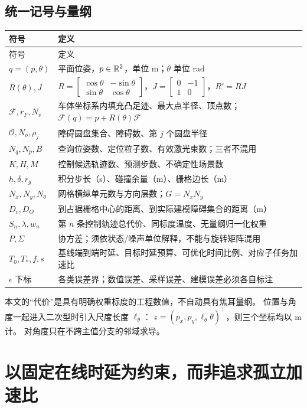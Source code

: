 \subsection{统一记号与量纲}
\begin{longtable}{p{}p{}}
\toprule 符号 & 定义\\\midrule\endfirsthead
\toprule 符号 & 定义\\\midrule\endhead
$q=(p,\theta)$ & 平面位姿，$p\in\mathbb R^2$，单位 m；$\theta$ 单位 rad\\
$R(\theta),J$ & $R=\left[\begin{smallmatrix}\cos\theta&-\sin\theta\\\sin\theta&\cos\theta\end{smallmatrix}\right]$，$J=\left[\begin{smallmatrix}0&-1\\1&0\end{smallmatrix}\right]$，$R'=RJ$\\
$\mathcal F,r_F,N_v$ & 车体坐标系内填充凸足迹、最大点半径、顶点数；$\mathcal F(q)=p+R(\theta)\mathcal F$\\
$\mathcal O,N_o,\rho_j$ & 障碍圆盘集合、障碍数、第 $j$ 个圆盘半径\\
$N_q,N_p,B$ & 查询位姿数、定位粒子数、有效激光束数；三者不混用\\
$K,H,M$ & 控制候选轨迹数、预测步数、不确定性场景数\\
$h,\delta,r_g$ & 积分步长（s）、碰撞余量（m）、栅格边长（m）\\
$N_x,N_y,N_\theta$ & 网格横纵单元数与方向层数；$G=N_xN_y$\\
$D_c,D_O$ & 到占据栅格中心的距离、到实际建模障碍集合的距离（m）\\
$S_n,\lambda,w_n$ & 第 $n$ 条控制轨迹总代价、同标度温度、无量纲归一化权重\\
$P,\Sigma$ & 协方差；须依状态/噪声单位解释，不能与旋转矩阵混用\\
$T_0,T_*,f,s$ & 基线端到端时延、目标时延预算、可优化时间比例、对应子任务加速比\\
$\epsilon$ 下标 & 各类误差界；数值误差、采样误差、建模误差必须各自标注\\
\bottomrule
\end{longtable}
本文的“代价”是具有明确权重标度的工程数值，不自动具有焦耳量纲。
位置与角度一起进入二次型时引入尺度长度 $\ell_\theta$：
$z=(p_x,p_y,\ell_\theta\theta)^\top$，则三个坐标均以 m 计。
对角度只在不跨主值分支的邻域求导。

\section{以固定在线时延为约束，而非追求孤立加速比}
